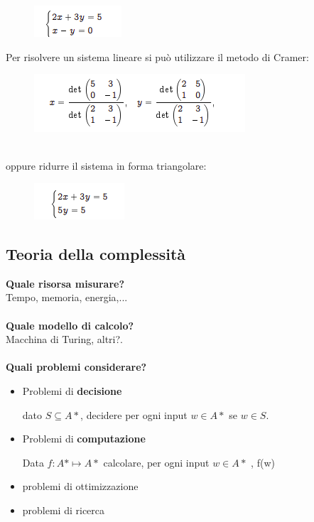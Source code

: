 \newpage
\begin{figure}[htp]
    \centering
    \includegraphics[scale=0.9]{tesi_stile/img/f2cap9.png}
\end{figure}
Per risolvere un sistema lineare si può utilizzare il metodo di Cramer:\\
\begin{figure}[htp]
    \centering
    \includegraphics[scale=0.9]{tesi_stile/img/f3cap9.png}
\end{figure}\\
oppure ridurre il sistema in forma triangolare:\\
\begin{figure}[htp]
    \centering
    \includegraphics[scale=0.9]{tesi_stile/img/f4cap9.png}
\end{figure}
\newpage
\subsection{Teoria della complessità}
\textbf{Quale risorsa misurare?}\\
Tempo, memoria, energia,...\\\\
\textbf{Quale modello di calcolo?}\\
Macchina di Turing, altri?.\\\\
\textbf{Quali problemi considerare?}\\
\begin{itemize}
    \item Problemi di \textbf{decisione}
    
dato $S \subseteq A*$, decidere per ogni input $w \in A*$ se $w \in S$.

    \item Problemi di \textbf{computazione}
    
Data $f : A* \mapsto A*$ calcolare, per ogni input $w \in A*$ , f(w)

    \item problemi di ottimizzazione
    
    \item problemi di ricerca

\end{itemize}
